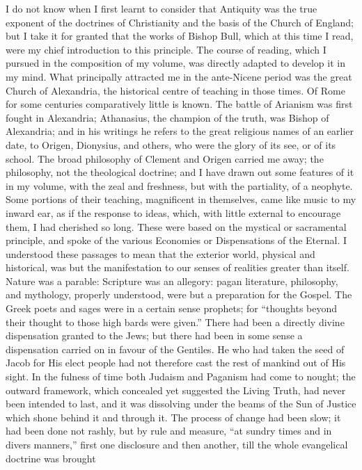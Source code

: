 I do not know when I first learnt to consider that Antiquity was
the true exponent of the doctrines of Christianity and the basis of
the Church of England; but I take it for granted that the works of Bishop Bull,
which at this
time I read, were my
chief introduction to this principle. The course of reading, which I
pursued in the composition of my volume, was directly adapted to
develop it in my mind. What
principally attracted me in the ante-Nicene period was the great
Church of Alexandria, the historical centre of teaching in those
times. Of Rome for some centuries comparatively little is known. The
battle of Arianism was first fought in Alexandria; Athanasius, the
champion of the truth, was Bishop of Alexandria; and in his writings
he refers to the great religious names of an earlier date, to Origen,
Dionysius, and others, who were the glory of its see, or of its school.
The broad philosophy of Clement and Origen carried me away; the
philosophy, not the theological doctrine; and I have drawn out some
features of it in my volume, with the zeal and freshness, but with the
partiality, of a neophyte. Some portions of their teaching,
magnificent in themselves, came like music to my inward ear, as if the
response to ideas, which, with little external to encourage them, I
had cherished so long. These were based on the mystical or sacramental
principle, and spoke of the various Economies or Dispensations of the
Eternal. I understood these passages
to mean that the exterior world, physical and historical, was but the manifestation
to our senses of realities greater
than itself. Nature was a parable: Scripture was an allegory: pagan literature, philosophy, and
mythology, properly understood, were but a preparation for the Gospel.
The Greek poets and sages were in a certain sense prophets; for
``thoughts beyond their thought to those high bards were
given.'' There had been a directly divine dispensation
granted to the Jews; but there had been in some sense a
dispensation carried on in favour of the Gentiles. He who had taken
the seed of Jacob for His elect people had not therefore cast the
rest of mankind out of His sight. In the fulness of time both Judaism
and Paganism had come to nought; the outward framework, which
concealed yet suggested the Living Truth, had never been intended to
last, and it was dissolving under the beams of the Sun of Justice which shone behind it and through it. The process of change
had been slow; it had been done not rashly, but by rule and measure, ``at sundry times and in divers
manners,'' first one disclosure and
then another, till the whole evangelical doctrine was brought
